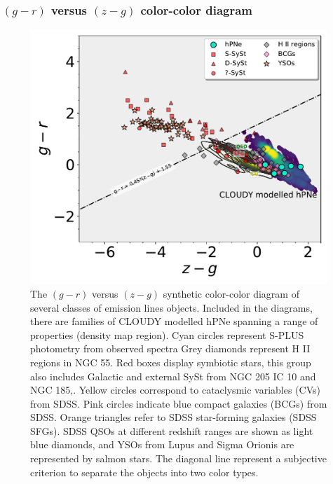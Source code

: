 \documentclass[fleqn,usenatbib]{mnras}
\begin{document}
\subsubsection{$(g - r)$ versus $(z - g)$ color-color diagram}

\begin{figure}
	\includegraphics[width=0.9\linewidth]{Figs/Fig-SPLUS-gr-zg.pdf}
        \caption{The $(g - r)$ versus $(z - g)$ synthetic color-color diagram of
          several classes of emission lines objects. Included in the diagrams, there
          are families of CLOUDY modelled hPNe spanning a range of properties (density
          map region). Cyan circles represent S-PLUS photometry from observed spectra
          Grey diamonds represent H II regions in NGC 55. Red
          boxes display symbiotic stars, this group also includes Galactic and
          external SySt from NGC 205 IC 10 and NGC 185,. Yellow circles correspond to
          cataclysmic variables (CVs) from SDSS. Pink circles indicate  blue compact
          galaxies (BCGs) from SDSS. Orange triangles refer to SDSS
          star-forming galaxies (SDSS SFGs). SDSS QSOs at different redshift
          ranges are shown as light blue diamonds, and YSOs from Lupus and
          Sigma Orionis are represented by salmon stars. The diagonal line represent
         a subjective criterion to separate the objects into two color types.}
    \label{fig:synthetic}
\end{figure}
\end{document}
